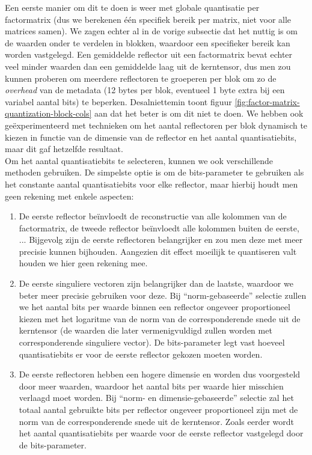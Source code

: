 Een eerste manier om dit te doen is weer met globale quantisatie per factormatrix (dus we berekenen \'e\'en specifiek bereik per matrix, niet voor alle matrices samen). We zagen echter al in de vorige subsectie dat het nuttig is om de waarden onder te verdelen in blokken, waardoor een specifieker bereik kan worden vastgelegd. Een gemiddelde reflector uit een factormatrix bevat echter veel minder waarden dan een gemiddelde laag uit de kerntensor, dus men zou kunnen proberen om meerdere reflectoren te groeperen per blok om zo de \textit{overhead} van de metadata (12 bytes per blok, eventueel 1 byte extra bij een variabel aantal bits) te beperken. Desalniettemin toont figuur \ref{fig:factor-matrix-quantization-block-cols} aan dat het beter is om dit niet te doen. We hebben ook ge\"experimenteerd met technieken om het aantal reflectoren per blok dynamisch te kiezen in functie van de dimensie van de reflector en het aantal quantisatiebits, maar dit gaf hetzelfde resultaat.\\

Om het aantal quantisatiebits te selecteren, kunnen we ook verschillende methoden gebruiken. De simpelste optie is om de bits-parameter te gebruiken als het constante aantal quantisatiebits voor elke reflector, maar hierbij houdt men geen rekening met enkele aspecten:

\begin{enumerate}

\item De eerste reflector be\"invloedt de reconstructie van alle kolommen van de factormatrix, de tweede reflector be\"invloedt alle kolommen buiten de eerste, ... Bijgevolg zijn de eerste reflectoren belangrijker en zou men deze met meer precisie kunnen bijhouden. Aangezien dit effect moeilijk te quantiseren valt houden we hier geen rekening mee.

\item De eerste singuliere vectoren zijn belangrijker dan de laatste, waardoor we beter meer precisie gebruiken voor deze. Bij ``norm-gebaseerde'' selectie zullen we het aantal bits per waarde binnen een reflector ongeveer proportioneel kiezen met het logaritme van de norm van de corresponderende snede uit de kerntensor (de waarden die later vermenigvuldigd zullen worden met corresponderende singuliere vector). De bits-parameter legt vast hoeveel quantisatiebits er voor de eerste reflector gekozen moeten worden.

\item De eerste reflectoren hebben een hogere dimensie en worden dus voorgesteld door meer waarden, waardoor het aantal bits per waarde hier misschien verlaagd moet worden. Bij ``norm- en dimensie-gebaseerde'' selectie zal het totaal aantal gebruikte bits per reflector ongeveer proportioneel zijn met de norm van de corresponderende snede uit de kerntensor. Zoals eerder wordt het aantal quantisatiebits per waarde voor de eerste reflector vastgelegd door de bits-parameter.

\end{enumerate}


